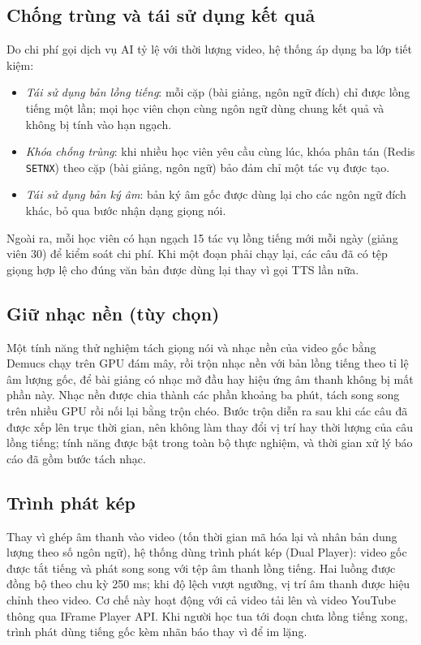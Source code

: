 \documentclass{IEEEtran}
\begin{document}
\subsection{Chống trùng và tái sử dụng kết quả}
Do chi phí gọi dịch vụ AI tỷ lệ với thời lượng video, hệ thống áp dụng ba lớp tiết kiệm:
\begin{itemize}
\item \emph{Tái sử dụng bản lồng tiếng}: mỗi cặp (bài giảng, ngôn ngữ đích) chỉ được lồng tiếng một lần; mọi học viên chọn cùng ngôn ngữ dùng chung kết quả và không bị tính vào hạn ngạch.
\item \emph{Khóa chống trùng}: khi nhiều học viên yêu cầu cùng lúc, khóa phân tán (Redis \texttt{SETNX}) theo cặp (bài giảng, ngôn ngữ) bảo đảm chỉ một tác vụ được tạo.
\item \emph{Tái sử dụng bản ký âm}: bản ký âm gốc được dùng lại cho các ngôn ngữ đích khác, bỏ qua bước nhận dạng giọng nói.
\end{itemize}
Ngoài ra, mỗi học viên có hạn ngạch 15 tác vụ lồng tiếng mới mỗi ngày (giảng viên 30) để kiểm soát chi phí. Khi một đoạn phải chạy lại, các câu đã có tệp giọng hợp lệ cho đúng văn bản được dùng lại thay vì gọi TTS lần nữa.

\subsection{Giữ nhạc nền (tùy chọn)}
Một tính năng thử nghiệm tách giọng nói và nhạc nền của video gốc bằng Demucs chạy trên GPU đám mây, rồi trộn nhạc nền với bản lồng tiếng theo tỉ lệ âm lượng gốc, để bài giảng có nhạc mở đầu hay hiệu ứng âm thanh không bị mất phần này. Nhạc nền được chia thành các phần khoảng ba phút, tách song song trên nhiều GPU rồi nối lại bằng trộn chéo. Bước trộn diễn ra sau khi các câu đã được xếp lên trục thời gian, nên không làm thay đổi vị trí hay thời lượng của câu lồng tiếng; tính năng được bật trong toàn bộ thực nghiệm, và thời gian xử lý báo cáo đã gồm bước tách nhạc.

\subsection{Trình phát kép}
Thay vì ghép âm thanh vào video (tốn thời gian mã hóa lại và nhân bản dung lượng theo số ngôn ngữ), hệ thống dùng trình phát kép (Dual Player): video gốc được tắt tiếng và phát song song với tệp âm thanh lồng tiếng. Hai luồng được đồng bộ theo chu kỳ 250 ms; khi độ lệch vượt ngưỡng, vị trí âm thanh được hiệu chỉnh theo video. Cơ chế này hoạt động với cả video tải lên và video YouTube thông qua IFrame Player API. Khi người học tua tới đoạn chưa lồng tiếng xong, trình phát dùng tiếng gốc kèm nhãn báo thay vì để im lặng.
\end{document}
